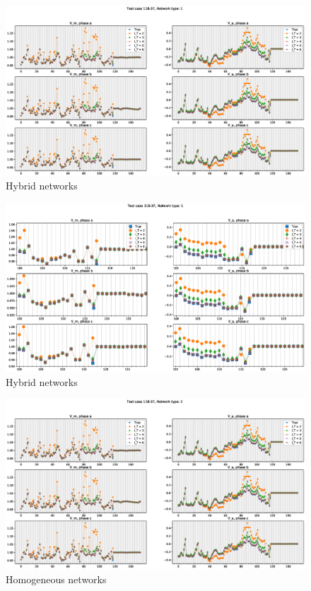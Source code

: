 \documentclass[10pt,journal]{article}
\begin{document}
\newpage 
\begin{figure}
\centering
\includegraphics[width=\textwidth]{Images/MAI_N1.eps}
\caption{Hybrid networks}
\end{figure}
\begin{figure}
\centering
\includegraphics[width=\textwidth]{Images/Z_MAI_N1.eps}
\caption{Hybrid networks}
\end{figure}
\begin{figure}
\centering
\includegraphics[width=\textwidth]{Images/MAI_N2.eps}
\caption{Homogeneous networks}
\end{figure}
\end{document}
